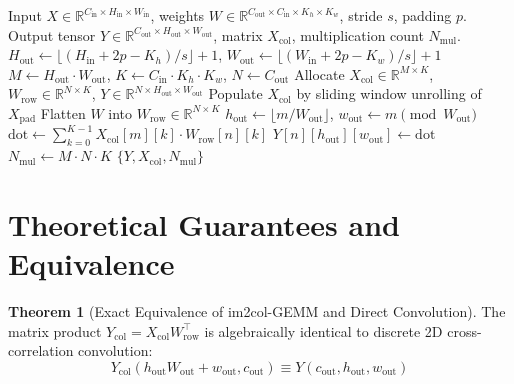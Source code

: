 \documentclass[11pt,a4paper]{article}
\theoremstyle{definition}
\newtheorem{theorem}{Theorem}[section]
\begin{document}
\begin{algorithm}[H]
\caption{im2col-GEMM Accelerated Convolution Execution}
\label{alg:im2col_gemm}
\begin{algorithmic}[1]
\Require Input $X \in \mathbb{R}^{C_{\text{in}} \times H_{\text{in}} \times W_{\text{in}}}$, weights $W \in \mathbb{R}^{C_{\text{out}} \times C_{\text{in}} \times K_h \times K_w}$, stride $s$, padding $p$.
\Ensure Output tensor $Y \in \mathbb{R}^{C_{\text{out}} \times H_{\text{out}} \times W_{\text{out}}}$, matrix $X_{\text{col}}$, multiplication count $N_{\text{mul}}$.
\State $H_{\text{out}} \gets \lfloor (H_{\text{in}} + 2p - K_h) / s \rfloor + 1$, $W_{\text{out}} \gets \lfloor (W_{\text{in}} + 2p - K_w) / s \rfloor + 1$
\State $M \gets H_{\text{out}} \cdot W_{\text{out}}$, $K \gets C_{\text{in}} \cdot K_h \cdot K_w$, $N \gets C_{\text{out}}$
\State Allocate $X_{\text{col}} \in \mathbb{R}^{M \times K}$, $W_{\text{row}} \in \mathbb{R}^{N \times K}$, $Y \in \mathbb{R}^{N \times H_{\text{out}} \times W_{\text{out}}}$
\State Populate $X_{\text{col}}$ by sliding window unrolling of $X_{\text{pad}}$
\State Flatten $W$ into $W_{\text{row}} \in \mathbb{R}^{N \times K}$
    \State $h_{\text{out}} \gets \lfloor m / W_{\text{out}} \rfloor$, $w_{\text{out}} \gets m \pmod{W_{\text{out}}}$
        \State $\text{dot} \gets \sum_{k=0}^{K-1} X_{\text{col}}[m][k] \cdot W_{\text{row}}[n][k]$
        \State $Y[n][h_{\text{out}}][w_{\text{out}}] \gets \text{dot}$
    \EndFor
\EndFor
\State $N_{\text{mul}} \gets M \cdot N \cdot K$
\State \Return $\{Y, X_{\text{col}}, N_{\text{mul}}\}$
\end{algorithmic}
\end{algorithm}

\section{Theoretical Guarantees and Equivalence}

\begin{theorem}[Exact Equivalence of im2col-GEMM and Direct Convolution]
The matrix product $Y_{\text{col}} = X_{\text{col}} W_{\text{row}}^\top$ is algebraically identical to discrete 2D cross-correlation convolution:
\begin{equation}
Y_{\text{col}}(h_{\text{out}} W_{\text{out}} + w_{\text{out}}, c_{\text{out}}) \equiv Y(c_{\text{out}}, h_{\text{out}}, w_{\text{out}})
\end{equation}
\end{theorem}
\end{document}
